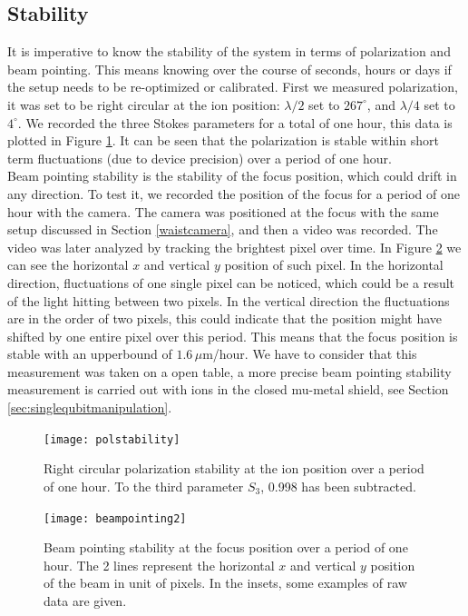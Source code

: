 \subsection{Stability}
\label{sec:stability}
It is imperative to know the stability of the system in terms of polarization and beam pointing. This means knowing over the course of seconds, hours or days if the setup needs to be re-optimized or calibrated. First we measured polarization, it was set to be right circular at the ion position: $\lambda/2$ set to $267^\circ$, and $\lambda/4$ set to $4^\circ$. We recorded the three Stokes parameters for a total of one hour, this data is plotted in Figure \ref{polstability}. It can be seen that the polarization is stable within short term fluctuations (due to device precision) over a period of one hour.\\
Beam pointing stability is the stability of the focus position, which could drift in any direction. To test it, we recorded the position of the focus for a period of one hour with the camera. The camera was positioned at the focus with the same setup discussed in Section \ref{waistcamera}, and then a video was recorded. The video was later analyzed by tracking the brightest pixel over time. In Figure \ref{beampointing} we can see the horizontal $x$ and vertical $y$ position of such pixel. In the horizontal direction, fluctuations of one single pixel can be noticed, which could be a result of the light hitting between two pixels. In the vertical direction the fluctuations are in the order of two pixels, this could indicate that the position might have shifted by one entire pixel over this period. This means that the focus position is stable with an upperbound of $1.6\,\mu$m/hour. We have to consider that this measurement was taken on a open table, a more precise beam pointing stability measurement is carried out with ions in the closed mu-metal shield, see Section \ref{sec:singlequbitmanipulation}.

\begin{figure}[H]
\centering
\texttt{[image: polstability]}
\caption{Right circular polarization stability at the ion position over a period of one hour. To the third parameter $S_3$, 0.998 has been subtracted.}
\label{polstability}
\end{figure}

\begin{figure}[H]
\centering
\texttt{[image: beampointing2]}
\caption{Beam pointing stability at the focus position over a period of one hour. The 2 lines represent the horizontal $x$ and vertical $y$ position of the beam in unit of pixels. In the insets, some examples of raw data are given.}
\label{beampointing}
\end{figure}



